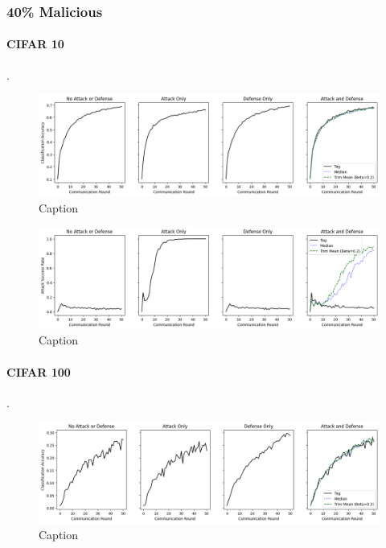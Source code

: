 \documentclass{article} %
\begin{document}
%
\pagebreak
\subsubsection{40\% Malicious}


%
\paragraph{CIFAR 10}.

\begin{figure}[H]
    \centering
    \includegraphics[width=\textwidth]{cifar_10/classic/tag/distributed/alpha10000--alpha_val10000/visuals/clean_accuracy--n_malicious4--beta0.2.png}
    \caption{Caption}
    \label{fig:my_label}
\end{figure}

\begin{figure}[H]
    \centering
    \includegraphics[width=\textwidth]{cifar_10/classic/tag/distributed/alpha10000--alpha_val10000/visuals/pois_accuracy--n_malicious4--beta0.2.png}
    \caption{Caption}
    \label{fig:my_label}
\end{figure}


%
\paragraph{CIFAR 100}.

\begin{figure}[H]
    \centering
    \includegraphics[width=\textwidth]{cifar_100/classic/tag/distributed/alpha10000--alpha_val10000/visuals/clean_accuracy--n_malicious4--beta0.2.png}
    \caption{Caption}
    \label{fig:my_label}
\end{figure}
\end{document}
